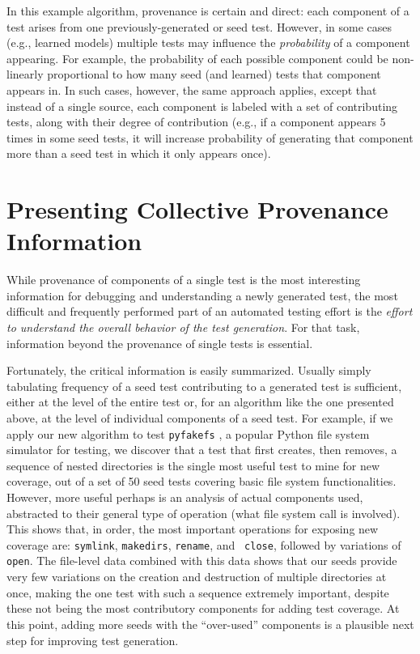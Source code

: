 \documentclass[final]{article}
\begin{document}
In this example algorithm, provenance is certain and direct:  each component of a
test arises from one previously-generated or seed test.  However, in
some cases (e.g., learned models) multiple tests may influence the
\emph{probability} of a component appearing.  For example, the
probability of each possible component could be non-linearly proportional to how
many seed (and learned) tests that component appears in.  In such cases,
however, the same approach applies, except that instead of a single
source, each component is labeled with a set of contributing tests,
along with their degree of contribution (e.g., if a component appears
5 times in some seed tests, it will increase probability of generating
that component more than a seed test in which it only appears once).

\section{Presenting Collective Provenance Information}

While provenance of components of a single test is the most
interesting information for debugging and understanding a newly
generated test, the most difficult and frequently performed part of an
automated testing effort is the \emph{effort to understand the overall
behavior of the test generation}.  For that task, information beyond
the provenance of single tests is essential.

Fortunately, the critical information is easily summarized.  Usually
simply tabulating frequency of a seed test contributing to a generated
test is sufficient, either at the level of the entire test or, for an
algorithm like the one presented above, at the level of individual
components of a seed test.  For example, if we apply our new algorithm
to test {\tt pyfakefs} \cite{pyfakefs}, a popular Python file system
simulator for testing, we discover that a test that first creates,
then removes, a sequence of nested directories is the single most
useful test to mine for new coverage, out of a set of 50 seed tests
covering basic file system functionalities.  However, more useful
perhaps is an analysis of actual components used, abstracted to their
general type of operation (what file system call is involved).  This
shows that, in order, the most important operations for exposing new
coverage are:  {\tt symlink}, {\tt makedirs}, {\tt rename}, and {\tt
  close}, followed by variations of {\tt open}.  The file-level data
combined with this data shows that our seeds provide very few
variations on the creation and destruction of multiple directories at
once, making the one test with such a sequence extremely important,
despite these not being the most contributory components for adding
test coverage.  At this point, adding more seeds with the
``over-used'' components is a plausible next step for improving test
generation.
\end{document}
